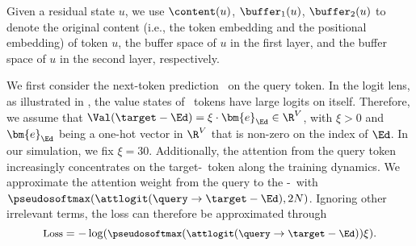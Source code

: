 Given a residual state $u$, we use $\content(u)$, $\buffer_1(u)$, $\buffer_2(u)$ to denote the original content (i.e., the token embedding and the positional embedding) of token $u$, the buffer space of $u$ in the first layer, and the buffer space of $u$ in the second layer, respectively.

We first consider the next-token prediction \logit~on the query token. In the logit lens, as illustrated in , the value states of \Ed~tokens have large logits on itself. Therefore, we assume that $\Val(\target-\Ed) = \xi \cdot \bm{e}_{\Ed} \in \R^V$, with $\xi>0$ and $\bm{e}_{\Ed}$ being a one-hot vector in $\R^V$ that is non-zero on the index of $\Ed$. In our simulation, we fix $\xi=30$. Additionally, the attention from the query token increasingly concentrates on the target-\Ed~token along the training dynamics.  We approximate the attention weight from the query to the \target-\Ed~with $\pseudosoftmax(\attlogit(\query\to\target-\Ed), 2N)$.
Ignoring other irrelevant terms, the loss can therefore be approximated through
\begin{equation}\small
\text{Loss} = -\log(\pseudosoftmax(\attlogit(\query\to\target-\Ed)) \xi). \label{eqn:loss}
\end{equation}

